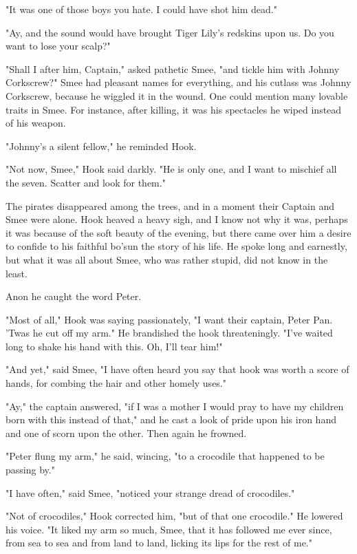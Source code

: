 "It was one of those boys you hate. I could have shot him dead."


"Ay, and the sound would have brought Tiger Lily's redskins upon us. Do
you want to lose your scalp?"


"Shall I after him, Captain," asked pathetic Smee, "and tickle him with
Johnny Corkscrew?" Smee had pleasant names for everything, and his cutlass
was Johnny Corkscrew, because he wiggled it in the wound. One could
mention many lovable traits in Smee. For instance, after killing, it was
his spectacles he wiped instead of his weapon.


"Johnny's a silent fellow," he reminded Hook.


"Not now, Smee," Hook said darkly. "He is only one, and I want to mischief
all the seven. Scatter and look for them."


The pirates disappeared among the trees, and in a moment their Captain and
Smee were alone. Hook heaved a heavy sigh, and I know not why it was,
perhaps it was because of the soft beauty of the evening, but there came
over him a desire to confide to his faithful bo'sun the story of his life.
He spoke long and earnestly, but what it was all about Smee, who was
rather stupid, did not know in the least.


Anon he caught the word Peter.


"Most of all," Hook was saying passionately, "I want their captain, Peter
Pan. 'Twas he cut off my arm." He brandished the hook threateningly. "I've
waited long to shake his hand with this. Oh, I'll tear him!"


"And yet," said Smee, "I have often heard you say that hook was worth a
score of hands, for combing the hair and other homely uses."


"Ay," the captain answered, "if I was a mother I would pray to have my
children born with this instead of that," and he cast a look of pride upon
his iron hand and one of scorn upon the other. Then again he frowned.


"Peter flung my arm," he said, wincing, "to a crocodile that happened to
be passing by."


"I have often," said Smee, "noticed your strange dread of crocodiles."


"Not of crocodiles," Hook corrected him, "but of that one crocodile." He
lowered his voice. "It liked my arm so much, Smee, that it has followed me
ever since, from sea to sea and from land to land, licking its lips for
the rest of me."


